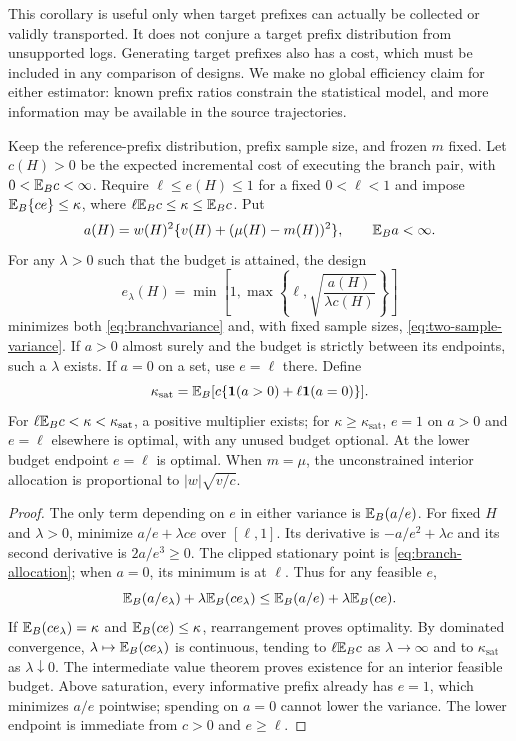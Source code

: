 This corollary is useful only when target prefixes can actually be collected or validly transported. It does not conjure a target prefix distribution from unsupported logs. Generating target prefixes also has a cost, which must be included in any comparison of designs. We make no global efficiency claim for either estimator: known prefix ratios constrain the statistical model, and more information may be available in the source trajectories.

\begin{proposition}
\label{prop:branch-allocation}
Keep the reference-prefix distribution, prefix sample size, and frozen $m$ fixed. Let $c(H)>0$ be the expected incremental cost of executing the branch pair, with $0<\mathbb{E}_Bc<\infty$. Require $\ell\le e(H)\le1$ for a fixed $0<\ell<1$ and impose $\mathbb{E}_B\{ce\}\le\kappa$, where $\ell\mathbb{E}_Bc\le\kappa\le\mathbb{E}_Bc$. Put
\begin{equation}
 a(H)=w(H)^2\{v(H)+(\mu(H)-m(H))^2\},\qquad \mathbb{E}_Ba<\infty.
 \label{eq:branch-a}
\end{equation}
For any $\lambda>0$ such that the budget is attained, the design
\begin{equation}
 e_\lambda(H)=\min\left[1,\max\left\{\ell,
       \sqrt{\frac{a(H)}{\lambda c(H)}}\right\}\right]
 \label{eq:branch-allocation}
\end{equation}
minimizes both \eqref{eq:branchvariance} and, with fixed sample sizes, \eqref{eq:two-sample-variance}. If $a>0$ almost surely and the budget is strictly between its endpoints, such a $\lambda$ exists. If $a=0$ on a set, use $e=\ell$ there. Define
\[
 \kappa_{\mathrm{sat}}=\mathbb{E}_B[c\{\mathbf{1}(a>0)+\ell\mathbf{1}(a=0)\}].
\]
For $\ell\mathbb{E}_Bc<\kappa<\kappa_{\mathrm{sat}}$, a positive multiplier exists; for $\kappa\ge\kappa_{\mathrm{sat}}$, $e=1$ on $a>0$ and $e=\ell$ elsewhere is optimal, with any unused budget optional. At the lower budget endpoint $e=\ell$ is optimal. When $m=\mu$, the unconstrained interior allocation is proportional to $|w|\sqrt{v/c}$.
\end{proposition}

\begin{proof}
The only term depending on $e$ in either variance is $\mathbb{E}_B(a/e)$. For fixed $H$ and $\lambda>0$, minimize $a/e+\lambda ce$ over $[\ell,1]$. Its derivative is $-a/e^2+\lambda c$ and its second derivative is $2a/e^3\ge0$. The clipped stationary point is \eqref{eq:branch-allocation}; when $a=0$, its minimum is at $\ell$. Thus for any feasible $e$,
\[
 \mathbb{E}_B(a/e_\lambda)+\lambda\mathbb{E}_B(ce_\lambda)
 \le\mathbb{E}_B(a/e)+\lambda\mathbb{E}_B(ce).
\]
If $\mathbb{E}_B(ce_\lambda)=\kappa$ and $\mathbb{E}_B(ce)\le\kappa$, rearrangement proves optimality. By dominated convergence, $\lambda\mapsto\mathbb{E}_B(ce_\lambda)$ is continuous, tending to $\ell\mathbb{E}_Bc$ as $\lambda\to\infty$ and to $\kappa_{\mathrm{sat}}$ as $\lambda\downarrow0$. The intermediate value theorem proves existence for an interior feasible budget. Above saturation, every informative prefix already has $e=1$, which minimizes $a/e$ pointwise; spending on $a=0$ cannot lower the variance. The lower endpoint is immediate from $c>0$ and $e\ge\ell$.
\end{proof}

